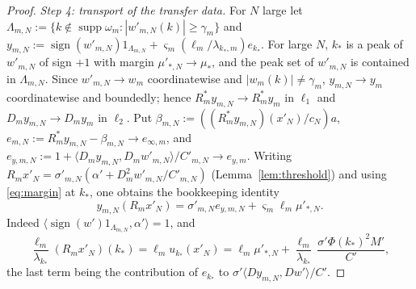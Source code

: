 \documentclass[10pt]{amsart}
\theoremstyle{definition}
\theoremstyle{remark}
\newcommand{\supp}{\operatorname{supp}}
\newcommand{\sgn}{\operatorname{sign}}
\newcommand{\ip}[2]{\langle #1,#2\rangle}
\begin{document}
\begin{proof}
\emph{Step 4: transport of the transfer data.}  For $N$ large let
$\Lambda_{m,N}:=\{k\notin\supp\omega_m:|w'_{m,N}(k)|\ge\gamma_m\}$ and
$y_{m,N}:=\sgn(w'_{m,N})1_{\Lambda_{m,N}}+\varsigma_m(\ell_m/\lambda_{k_*,m})
e_{k_*}$.  For large $N$, $k_*$ is a peak of $w'_{m,N}$ of sign $+1$ with
margin $\mu'_{*,N}\to\mu_*$, and the peak set of $w'_{m,N}$ is contained
in $\Lambda_{m,N}$.  Since $w'_{m,N}\to w_m$ coordinatewise and
$|w_m(k)|\ne\gamma_m$, $y_{m,N}\to y_m$ coordinatewise and boundedly; hence
$R_m^*y_{m,N}\to R_m^*y_m$ in $\ell_1$ and $D_my_{m,N}\to D_my_m$ in
$\ell_2$.  Put $\beta_{m,N}:=((R_m^*y_{m,N})(x'_N)/c_N)a$,
$e_{m,N}:=R_m^*y_{m,N}-\beta_{m,N}\to e_{\infty,m}$, and
$e_{y,m,N}:=1+\ip{D_my_{m,N}}{D_mw'_{m,N}}/C'_{m,N}\to e_{y,m}$.  Writing
$R_mx'_N=\sigma'_{m,N}(\alpha'+D_m^2w'_{m,N}/C'_{m,N})$
(Lemma~\ref{lem:threshold}) and using \eqref{eq:margin} at $k_*$, one obtains
the bookkeeping identity
\begin{equation}\label{eq:bookkeeping}
 y_{m,N}(R_mx'_N)=\sigma'_{m,N}e_{y,m,N}+\varsigma_m\ell_m\mu'_{*,N}.
\end{equation}
Indeed $\ip{\sgn(w')1_{\Lambda_{m,N}}}{\alpha'}=1$, and
\[
 \frac{\ell_m}{\lambda_{k_*}}(R_mx'_N)(k_*)=\ell_mu_{k_*}(x'_N)=
 \ell_m\mu'_{*,N}+\frac{\ell_m}{\lambda_{k_*}}\,\frac{\sigma'\Phi(k_*)^2M'}{C'},
\]
the last term being the contribution of $e_{k_*}$ to
$\sigma'\ip{D y_{m,N}}{Dw'}/C'$.


\end{proof}
\end{document}
